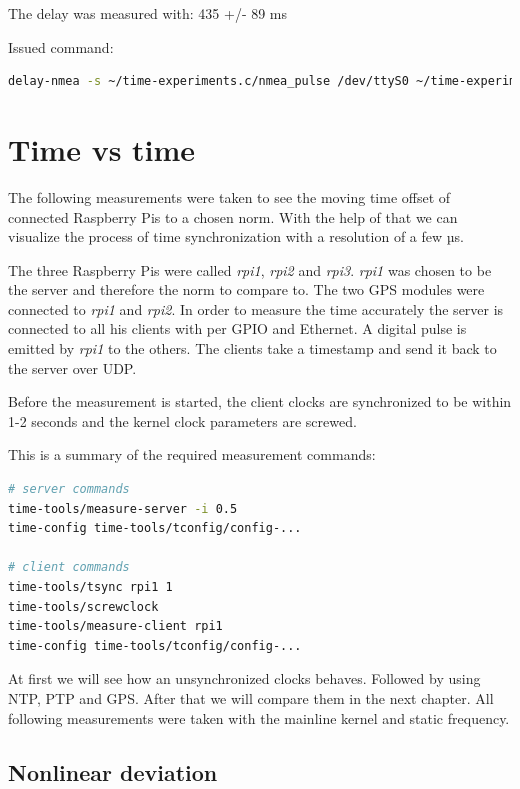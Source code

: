 The delay was measured with: 435 +/- 89 ms

Issued command:

\begin{lstlisting}[language=bash]
delay-nmea -s ~/time-experiments.c/nmea_pulse /dev/ttyS0 ~/time-experiments.c/pps_pulse /dev/pps0
\end{lstlisting}

\section{Time vs time}

The following measurements were taken to see the moving time offset of connected Raspberry Pis to a chosen norm. With the help of that we can visualize the process of time synchronization with a resolution of a few µs.

The three Raspberry Pis were called \textit{rpi1}, \textit{rpi2} and \textit{rpi3}. \textit{rpi1} was chosen to be the server and therefore the norm to compare to. The two GPS modules were connected to \textit{rpi1} and \textit{rpi2}. In order to measure the time accurately the server is connected to all his clients with per GPIO and Ethernet. A digital pulse is emitted by \textit{rpi1} to the others. The clients take a timestamp and send it back to the server over UDP.

Before the measurement is started, the client clocks are synchronized to be within 1-2 seconds and the kernel clock parameters are screwed.

This is a summary of the required measurement commands:

\begin{lstlisting}[language=bash]
# server commands
time-tools/measure-server -i 0.5
time-config time-tools/tconfig/config-...

# client commands
time-tools/tsync rpi1 1
time-tools/screwclock
time-tools/measure-client rpi1
time-config time-tools/tconfig/config-...
\end{lstlisting}

At first we will see how an unsynchronized clocks behaves. Followed by using NTP, PTP and GPS. After that we will compare them in the next chapter. All following measurements were taken with the mainline kernel and static frequency.

\subsection{Nonlinear deviation}

